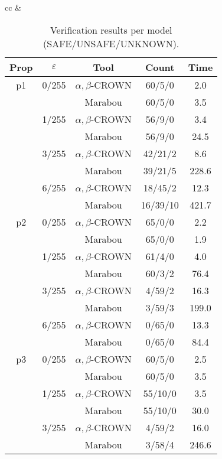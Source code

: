 
\begin{table*}[htbp]
\centering
\caption{Verification results per model (SAFE/UNSAFE/UNKNOWN).}
\setlength{\tabcolsep}{6pt}
\renewcommand{\arraystretch}{1.1}
\begin{tabular}{cc}
 & \\
\begin{minipage}{0.48\linewidth}
\setlength{\extrarowheight}{0pt}
\begin{tabular}{|c|c|c|c|c|}
\hline
Prop & $\varepsilon$ & Tool & Count & Time\\
\hline
p1 & 0/255 & $\alpha, \beta$-CROWN & 60/5/0 & 2.0 \\
 &  & Marabou & 60/5/0 & 3.5 \\
\cline{2-5}
 & 1/255 & $\alpha, \beta$-CROWN & 56/9/0 & 3.4 \\
 &  & Marabou & 56/9/0 & 24.5 \\
\cline{2-5}
 & 3/255 & $\alpha, \beta$-CROWN & 42/21/2 & 8.6 \\
 &  & Marabou & 39/21/5 & 228.6 \\
\cline{2-5}
 & 6/255 & $\alpha, \beta$-CROWN & 18/45/2 & 12.3 \\
 &  & Marabou & 16/39/10 & 421.7 \\
\cline{2-5}
\hline
p2 & 0/255 & $\alpha, \beta$-CROWN & 65/0/0 & 2.2 \\
 &  & Marabou & 65/0/0 & 1.9 \\
\cline{2-5}
 & 1/255 & $\alpha, \beta$-CROWN & 61/4/0 & 4.0 \\
 &  & Marabou & 60/3/2 & 76.4 \\
\cline{2-5}
 & 3/255 & $\alpha, \beta$-CROWN & 4/59/2 & 16.3 \\
 &  & Marabou & 3/59/3 & 199.0 \\
\cline{2-5}
 & 6/255 & $\alpha, \beta$-CROWN & 0/65/0 & 13.3 \\
 &  & Marabou & 0/65/0 & 84.4 \\
\cline{2-5}
\hline
p3 & 0/255 & $\alpha, \beta$-CROWN & 60/5/0 & 2.5 \\
 &  & Marabou & 60/5/0 & 3.5 \\
\cline{2-5}
 & 1/255 & $\alpha, \beta$-CROWN & 55/10/0 & 3.5 \\
 &  & Marabou & 55/10/0 & 30.0 \\
\cline{2-5}
 & 3/255 & $\alpha, \beta$-CROWN & 4/59/2 & 16.0 \\
 &  & Marabou & 3/58/4 & 246.6 \\

\end{tabular}
\end{minipage}
\end{tabular}
\end{table*}
